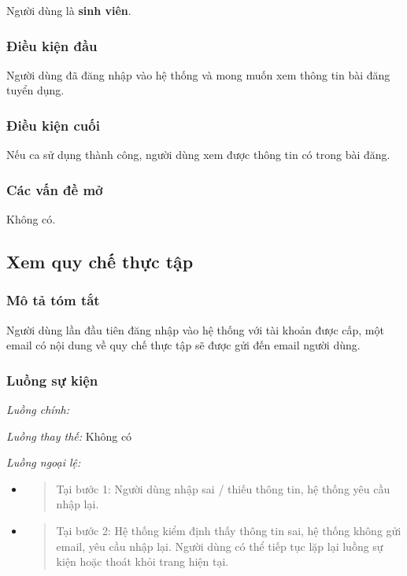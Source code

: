\documentclass[./../main.tex]{subfiles}
\begin{document}
Người dùng là \textbf{sinh viên}.

\subsubsection*{Điều kiện đầu}

Người dùng đã đăng nhập vào hệ thống và mong muốn xem thông tin bài đăng
tuyển dụng.

\subsubsection*{Điều kiện cuối}

Nếu ca sử dụng thành công, người dùng xem được thông tin có trong bài
đăng.

\subsubsection*{Các vấn đề mở}

Không có.

\subsection{Xem quy chế thực tập}

\subsubsection*{Mô tả tóm tắt}

Người dùng lần đầu tiên đăng nhập vào hệ thống với tài khoản được cấp,
một email có nội dung về quy chế thực tập sẽ được gửi đến email người
dùng.

\subsubsection*{Luồng sự kiện}

\emph{Luồng chính:}

\emph{Luồng thay thế:} Không có

\emph{Luồng ngoại lệ:}

\begin{itemize}
\item
  \begin{quote}
  Tại bước 1: Người dùng nhập sai / thiếu thông tin, hệ thống yêu cầu
  nhập lại.
  \end{quote}
\item
  \begin{quote}
  Tại bước 2: Hệ thống kiểm định thấy thông tin sai, hệ thống không gửi
  email, yêu cầu nhập lại. Người dùng có thể tiếp tục lặp lại luồng sự
  kiện hoặc thoát khỏi trang hiện tại.
  \end{quote}
\end{itemize}
\end{document}
